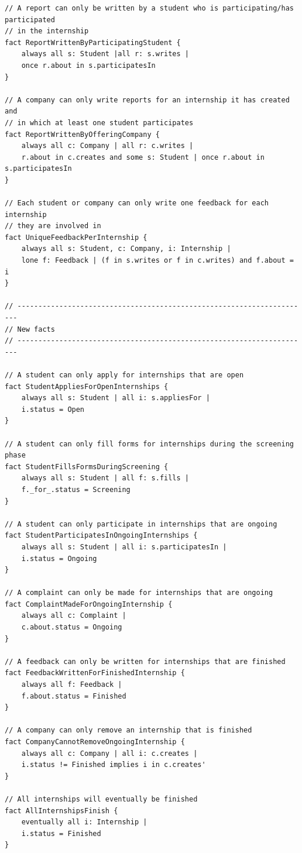 \documentclass[11pt,twoside]{article}
\begin{document}
{\begin{verbatim}
// A report can only be written by a student who is participating/has participated 
// in the internship
fact ReportWrittenByParticipatingStudent {
    always all s: Student |all r: s.writes |
    once r.about in s.participatesIn
}

// A company can only write reports for an internship it has created and
// in which at least one student participates
fact ReportWrittenByOfferingCompany {
    always all c: Company | all r: c.writes |
    r.about in c.creates and some s: Student | once r.about in s.participatesIn
}

// Each student or company can only write one feedback for each internship
// they are involved in
fact UniqueFeedbackPerInternship {
    always all s: Student, c: Company, i: Internship |
    lone f: Feedback | (f in s.writes or f in c.writes) and f.about = i
}

// ----------------------------------------------------------------------
// New facts
// ----------------------------------------------------------------------

// A student can only apply for internships that are open
fact StudentAppliesForOpenInternships {
    always all s: Student | all i: s.appliesFor |
    i.status = Open
}

// A student can only fill forms for internships during the screening phase
fact StudentFillsFormsDuringScreening {
    always all s: Student | all f: s.fills |
    f._for_.status = Screening
}

// A student can only participate in internships that are ongoing
fact StudentParticipatesInOngoingInternships {
    always all s: Student | all i: s.participatesIn |
    i.status = Ongoing
}

// A complaint can only be made for internships that are ongoing
fact ComplaintMadeForOngoingInternship {
    always all c: Complaint |
    c.about.status = Ongoing
}

// A feedback can only be written for internships that are finished
fact FeedbackWrittenForFinishedInternship {
    always all f: Feedback |
    f.about.status = Finished
}

// A company can only remove an internship that is finished
fact CompanyCannotRemoveOngoingInternship {
    always all c: Company | all i: c.creates |
    i.status != Finished implies i in c.creates'
}

// All internships will eventually be finished
fact AllInternshipsFinish {
    eventually all i: Internship |
    i.status = Finished
}


\end{verbatim}}
\end{document}
